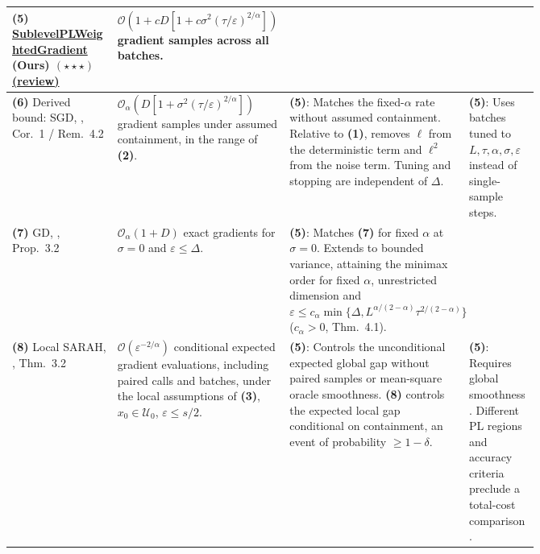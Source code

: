 \begin{table}[tp]
\begin{threeparttable}
\begin{tabularx}{\linewidth}{@{}>{\raggedright\arraybackslash}p{0.20\linewidth}>{\raggedright\arraybackslash}p{0.32\linewidth}>{\raggedright\arraybackslash}p{0.235\linewidth}>{\raggedright\arraybackslash}X@{}}
\midrule
\textbf{(5)} \href{https://github.com/k3nfalt/longtails/blob/main/LongTails/Theorems/SublevelPLWeightedGradient.lean}{Sublevel\allowbreak PL\allowbreak Weighted\allowbreak Gradient} \textbf{(Ours)} $(\star\star\star)$ \href{https://github.com/k3nfalt/longtails/blob/main/scripts/reviews/SublevelPLWeightedGradient.md}{(review)}
& $\mathcal{O}\!\left(1+cD[1+c\sigma^2(\tau/\varepsilon)^{2/\alpha}]\right)$ gradient samples across all batches.
& & \\
\midrule
\textbf{(6)} Derived bound: SGD, \citep{splFatkhullin2022v1,splMasiha2026v3}, Cor.~1 / Rem.~4.2
& $\mathcal{O}_{\alpha}\!\left(D[1+\sigma^2(\tau/\varepsilon)^{2/\alpha}]\right)$ gradient samples under assumed containment, in the range of \textbf{(2)}.
& \textbf{(5)}: Matches the fixed-$\alpha$ rate without assumed containment. Relative to \textbf{(1)}, removes $\ell$ from the deterministic term and $\ell^2$ from the noise term. Tuning and stopping are independent of $\Delta$.
& \textbf{(5)}: Uses batches tuned to $L,\tau,\alpha,\sigma,\varepsilon$ instead of single-sample steps. \\
\midrule
\textbf{(7)} GD, \citep{splMasiha2026v3}, Prop.~3.2
& $\mathcal{O}_{\alpha}(1+D)$ exact gradients for $\sigma=0$ and $\varepsilon\le\Delta$.
& \textbf{(5)}: Matches \textbf{(7)} for fixed $\alpha$ at $\sigma=0$. Extends to bounded variance, attaining the minimax order for fixed $\alpha$, unrestricted dimension and $\varepsilon\le c_\alpha\min\{\Delta,L^{\alpha/(2-\alpha)}\tau^{2/(2-\alpha)}\}$ ($c_\alpha>0$, Thm.~4.1).
& \\
\midrule
\textbf{(8)} Local SARAH, \citep{splMasihaLocal2026v2}, Thm.~3.2
& $\mathcal{O}(\varepsilon^{-2/\alpha})$ conditional expected gradient evaluations, including paired calls and batches, under the local assumptions of \textbf{(3)}, $x_0\in\mathcal U_0$, $\varepsilon\le s/2$.
& \textbf{(5)}: Controls the unconditional expected global gap without paired samples or mean-square oracle smoothness. \textbf{(8)} controls the expected local gap conditional on containment, an event of probability $\ge1-\delta$.
& \textbf{(5)}: Requires global smoothness. Different PL regions and accuracy criteria preclude a total-cost comparison. \\
\bottomrule
\end{tabularx}
\begin{tablenotes}[flushleft]\footnotesize

\end{tablenotes}
\end{threeparttable}
\end{table}
